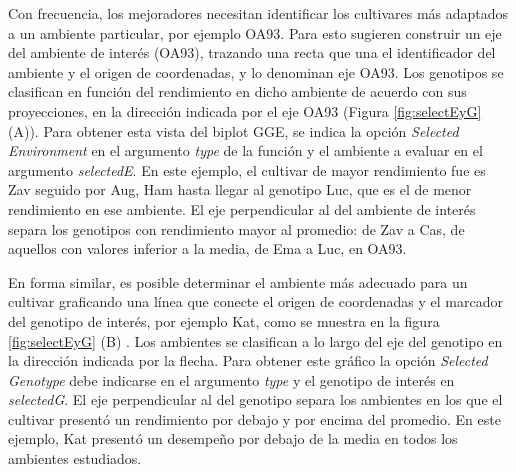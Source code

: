 Con frecuencia, los mejoradores necesitan identificar los cultivares más adaptados a un ambiente particular, por ejemplo OA93. Para esto \citep{YanKang2003} sugieren construir un eje del ambiente de interés (OA93), trazando una recta que una el identificador del ambiente y el origen de coordenadas, y lo denominan eje OA93. Los genotipos se  clasifican en función del rendimiento en dicho ambiente de acuerdo con sus proyecciones, en la dirección indicada por el eje OA93 (Figura \ref{fig:selectEyG} (A)). Para obtener esta vista del biplot GGE, se indica la opción \emph{Selected Environment} en el argumento \emph{type} de la función y el ambiente a evaluar en el argumento  \emph{selectedE}. En este ejemplo, el cultivar de mayor rendimiento fue es Zav seguido por Aug, Ham hasta llegar al genotipo Luc, que es el de menor rendimiento en ese ambiente. El eje perpendicular al del ambiente de interés separa los genotipos con rendimiento mayor al promedio: de Zav a Cas, de aquellos con valores inferior a la media, de Ema a Luc, en OA93.
 
En forma similar, es posible determinar el ambiente más adecuado para un cultivar graficando una línea que conecte el origen de coordenadas y el marcador del genotipo de interés, por ejemplo Kat, como se muestra en la figura \ref{fig:selectEyG} (B) \citep{YanKang2003}. Los ambientes se clasifican a lo largo del eje del genotipo en la dirección indicada por la flecha. Para obtener este gráfico la opción  \emph{Selected Genotype} debe indicarse en el argumento \emph{type} y el genotipo de interés en \emph{selectedG}. El eje perpendicular al del genotipo separa los ambientes en los que el cultivar presentó un rendimiento por debajo y por encima del promedio. En este ejemplo, Kat presentó un desempeño por debajo de la media en todos los ambientes estudiados. \\

